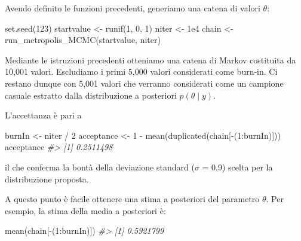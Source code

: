 \documentclass[
]{memoir}
\newenvironment{Shaded}{\begin{snugshade}}{\end{snugshade}}
\newcommand{\CommentTok}[1]{\textcolor[rgb]{0.56,0.35,0.01}{\textit{#1}}}
\newcommand{\DecValTok}[1]{\textcolor[rgb]{0.00,0.00,0.81}{#1}}
\newcommand{\FloatTok}[1]{\textcolor[rgb]{0.00,0.00,0.81}{#1}}
\newcommand{\FunctionTok}[1]{\textcolor[rgb]{0.00,0.00,0.00}{#1}}
\newcommand{\NormalTok}[1]{#1}
\newcommand{\OtherTok}[1]{\textcolor[rgb]{0.56,0.35,0.01}{#1}}
\newcommand{\SpecialCharTok}[1]{\textcolor[rgb]{0.00,0.00,0.00}{#1}}
\begin{document}
Avendo definito le funzioni precedenti, generiamo una catena di valori \(\theta\):

\begin{Shaded}
\begin{Highlighting}[]
\FunctionTok{set.seed}\NormalTok{(}\DecValTok{123}\NormalTok{)}
\NormalTok{startvalue }\OtherTok{\textless{}{-}} \FunctionTok{runif}\NormalTok{(}\DecValTok{1}\NormalTok{, }\DecValTok{0}\NormalTok{, }\DecValTok{1}\NormalTok{)}
\NormalTok{niter }\OtherTok{\textless{}{-}} \FloatTok{1e4}
\NormalTok{chain }\OtherTok{\textless{}{-}} \FunctionTok{run\_metropolis\_MCMC}\NormalTok{(startvalue, niter)}
\end{Highlighting}
\end{Shaded}

Mediante le istruzioni precedenti otteniamo una catena di Markov costituita da 10,001 valori. Escludiamo i primi 5,000 valori considerati come burn-in. Ci restano dunque con 5,001 valori che verranno considerati come un campione casuale estratto dalla distribuzione a posteriori \(p(\theta \mid y)\).

L'accettanza è pari a

\begin{Shaded}
\begin{Highlighting}[]
\NormalTok{burnIn }\OtherTok{\textless{}{-}}\NormalTok{ niter }\SpecialCharTok{/} \DecValTok{2}
\NormalTok{acceptance }\OtherTok{\textless{}{-}} \DecValTok{1} \SpecialCharTok{{-}} \FunctionTok{mean}\NormalTok{(}\FunctionTok{duplicated}\NormalTok{(chain[}\SpecialCharTok{{-}}\NormalTok{(}\DecValTok{1}\SpecialCharTok{:}\NormalTok{burnIn)]))}
\NormalTok{acceptance}
\CommentTok{\#\textgreater{} [1] 0.2511498}
\end{Highlighting}
\end{Shaded}

\noindent
il che conferma la bontà della deviazione standard (\(\sigma\) = 0.9) scelta per la distribuzione proposta.

A questo punto è facile ottenere una stima a posteriori del parametro \(\theta\). Per esempio, la stima della media a posteriori è:

\begin{Shaded}
\begin{Highlighting}[]
\FunctionTok{mean}\NormalTok{(chain[}\SpecialCharTok{{-}}\NormalTok{(}\DecValTok{1}\SpecialCharTok{:}\NormalTok{burnIn)])}
\CommentTok{\#\textgreater{} [1] 0.5921799}
\end{Highlighting}
\end{Shaded}
\end{document}
